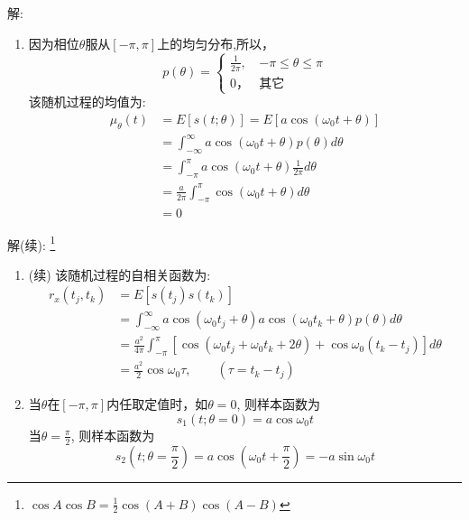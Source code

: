 \begin{frame}
解:
\begin{enumerate}
\item 因为相位$\theta$服从$[-\pi,\pi]$上的均匀分布,所以，
$$p(\theta)=\begin{cases}
\frac{1}{2\pi}, & -\pi\le\theta\le\pi\\
0， &\text{其它}
\end{cases} $$ 
该随机过程的均值为:
\begin{align*}
\mu_{\theta}(t)&=E[s(t; \theta)]=E[a\cos(\omega_0t+\theta)]\\
&=\int_{-\infty}^{\infty}a\cos(\omega_0t+\theta)p(\theta)d\theta\\
&=\int_{-\pi}^{\pi}a\cos(\omega_0t+\theta)\frac{1}{2\pi}d\theta\\
&=\frac{a}{2\pi}\int_{-\pi}^{\pi}\cos(\omega_0t+\theta)d\theta\\
&=0
\end{align*}
\end{enumerate}
\end{frame}

\begin{frame}
解(续): \footnote{$\cos A\cos B=\frac{1}{2}\cos (A+B)\cos(A-B)$}
\begin{enumerate}
\item (续) 该随机过程的自相关函数为:
\begin{align*}
r_x(t_j,t_k)&=E[s(t_j)s(t_k)]\\
&=\int_{-\infty}^{\infty}a\cos(\omega_0t_j+\theta)a\cos(\omega_0t_k+\theta)p(\theta)d\theta\\
&=\frac{a^2}{4\pi}\int_{-\pi}^{\pi}[\cos(\omega_0t_j+\omega_0t_k+2\theta)+\cos\omega_0(t_k-t_j)]d\theta\\
&=\frac{a^2}{2}\cos\omega_0\tau,\qquad(\tau=t_k-t_j)
\end{align*}
\item 当$\theta$在$[-\pi,\pi]$内任取定值时，如$\theta=0$, 则样本函数为
$$s_1(t; \theta=0)=a\cos\omega_0t$$
当$\theta=\frac{\pi}{2}$, 则样本函数为
$$s_2(t; \theta=\frac{\pi}{2})=a\cos(\omega_0t+\frac{\pi}{2})=-a\sin\omega_0t$$
\end{enumerate}
\end{frame}

